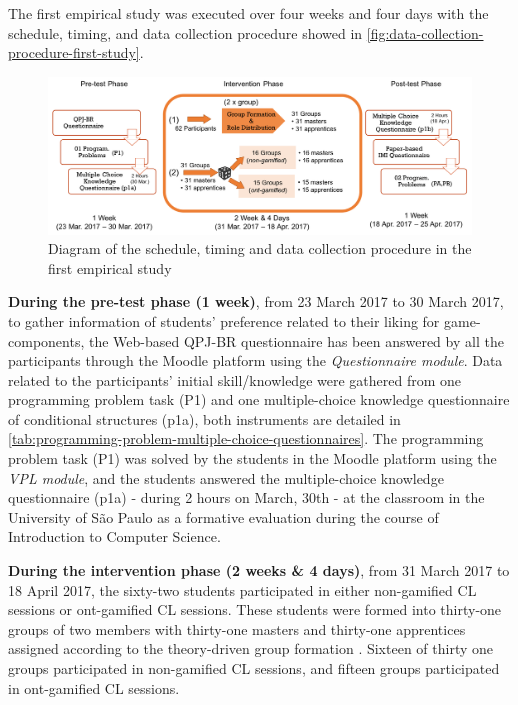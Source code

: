 The first empirical study was executed over four weeks and four days with the schedule, timing, and data collection procedure showed in \autoref{fig:data-collection-procedure-first-study}.

\begin{figure}[htb]
 \caption{Diagram of the schedule, timing and data collection procedure in the first empirical study}
 \label{fig:data-collection-procedure-first-study}
 \centering
 \includegraphics[width=1\textwidth]{images/chap-evaluation/data-collection-procedure-first-study.png}
 \fautor
\end{figure}

\textbf{During the pre-test phase (1 week)}, from 23 March 2017 to 30 March 2017, to gather information of students' preference related to their liking for game-components, the Web-based QPJ-BR questionnaire has been answered by all the participants through the Moodle platform using the \emph{Questionnaire module}.
Data related to the participants' initial skill/knowledge were gathered from one programming problem task (P1) and one multiple-choice knowledge questionnaire of conditional structures (p1a), both instruments are detailed in \autoref{tab:programming-problem-multiple-choice-questionnaires}. 
The programming problem task (P1) was solved by the students in the Moodle platform using the \emph{VPL module}, and the students answered the multiple-choice knowledge questionnaire (p1a) - during 2 hours on March, 30th - at the classroom in the University of São Paulo as a formative evaluation during the course of Introduction to Computer Science. 

\textbf{During the intervention phase (2 weeks \& 4 days)}, from 31 March 2017 to 18 April 2017, the sixty-two students participated in either non-gamified CL sessions or ont-gamified CL sessions.
These students were formed into thirty-one groups of two members with thirty-one masters and thirty-one apprentices assigned according to the theory-driven group formation \cite{IsotaniMizoguchi2008a}. 
Sixteen of thirty one groups participated in non-gamified CL sessions, and fifteen groups participated in ont-gamified CL sessions.

